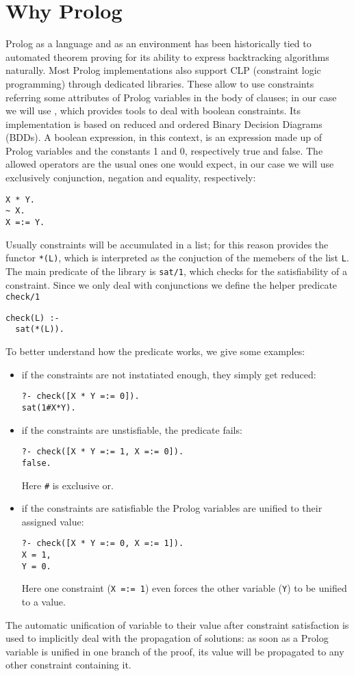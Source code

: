 \section{Why Prolog}%
Prolog as a language and as an environment has been historically tied to automated theorem proving for its ability to express backtracking algorithms naturally.
Most Prolog implementations also support CLP (constraint logic programming) through dedicated libraries.
These allow to use constraints referring some attributes of Prolog variables in the body of clauses; in our case we will use \CLPB{} \cite{clpb}, which provides tools to deal with boolean constraints.
Its implementation is based on reduced and ordered Binary Decision Diagrams (BDDs).
A boolean expression, in this context, is an expression made up of Prolog variables and the constants 1 and 0, respectively true and false.
The allowed operators are the usual ones one would expect, in our case we will use exclusively conjunction, negation and equality, respectively:
\begin{verbatim}
X * Y.
~ X.
X =:= Y.
\end{verbatim}
Usually constraints will be accumulated in a list; for this reason \CLPB{} provides the functor \texttt{*(L)}, which is interpreted as the conjuction of the memebers of the list \texttt{L}.
The main predicate of the library is \texttt{sat/1}, which checks for the satisfiability of a constraint.
Since we only deal with conjunctions we define the helper predicate \texttt{check/1}
\begin{verbatim}
check(L) :-
  sat(*(L)).
\end{verbatim}
To better understand how the predicate works, we give some examples:
\begin{itemize}
	\item if the constraints are not instatiated enough, they simply get reduced:
\begin{verbatim}
?- check([X * Y =:= 0]).
sat(1#X*Y).
\end{verbatim}
	\item if the constraints are unstisfiable, the predicate fails:
\begin{verbatim}
?- check([X * Y =:= 1, X =:= 0]).
false.
\end{verbatim}
	Here \texttt{\#} is exclusive or.
	\item if the constraints are satisfiable the Prolog variables are unified to their assigned value:
\begin{verbatim}
?- check([X * Y =:= 0, X =:= 1]).
X = 1,
Y = 0.
\end{verbatim}
	Here one constraint (\texttt{X =:= 1}) even forces the other variable (\texttt{Y}) to be unified to a value.
\end{itemize}
The automatic unification of variable to their value after constraint satisfaction is used to implicitly deal with the propagation of solutions: as soon as a Prolog variable is unified in one branch of the proof, its value will be propagated to any other constraint containing it.

